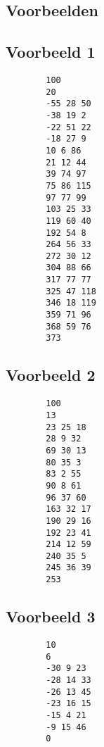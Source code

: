 \documentclass[10pt,tikz]{article}
\begin{document}
\newpage
\begin{appendices}
	\section{Voorbeelden}
    \label{app:voorbeelden}

	\subsection*{Voorbeeld 1}
	\begin{lstlisting}
        100
        20
        -55 28 50
        -38 19 2
        -22 51 22
        -18 27 9
        10 6 86
        21 12 44
        39 74 97
        75 86 115
        97 77 99
        103 25 33
        119 60 40
        192 54 8
        264 56 33
        272 30 12
        304 88 66
        317 77 77
        325 47 118
        346 18 119
        359 71 96
        368 59 76
        373
    \end{lstlisting}

	\subsection*{Voorbeeld 2}
	\begin{lstlisting}
        100
        13
        23 25 18
        28 9 32
        69 30 13
        80 35 3
        83 2 55
        90 8 61
        96 37 60
        163 32 17
        190 29 16
        192 23 41
        214 12 59
        240 35 5
        245 36 39
        253
    \end{lstlisting}

	\subsection*{Voorbeeld 3}
	\begin{lstlisting}
        10
        6
        -30 9 23
        -28 14 33
        -26 13 45
        -23 16 15
        -15 4 21
        -9 15 46
        0
    \end{lstlisting}

\end{appendices}
\end{document}
